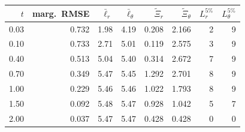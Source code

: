\begin{tabular}{@{}rrrrrrrr@{}}
\toprule
$t$ & marg.\ RMSE & $\bar\ell_r$ & $\bar\ell_\theta$ & $\widetilde\Xi_r$ & $\widetilde\Xi_\theta$ & $L_r^{5\%}$ & $L_\theta^{5\%}$ \\
\midrule
0.03 & 0.732 & 1.98 & 4.19 & 0.208 & 2.166 & 2 & 9 \\
0.10 & 0.733 & 2.71 & 5.01 & 0.119 & 2.575 & 3 & 9 \\
0.40 & 0.513 & 5.04 & 5.40 & 0.314 & 2.672 & 7 & 9 \\
0.70 & 0.349 & 5.47 & 5.45 & 1.292 & 2.701 & 8 & 9 \\
1.00 & 0.229 & 5.46 & 5.46 & 1.022 & 1.793 & 8 & 9 \\
1.50 & 0.092 & 5.48 & 5.47 & 0.928 & 1.042 & 5 & 7 \\
2.00 & 0.037 & 5.47 & 5.47 & 0.428 & 0.428 & 0 & 0 \\
\bottomrule
\end{tabular}
